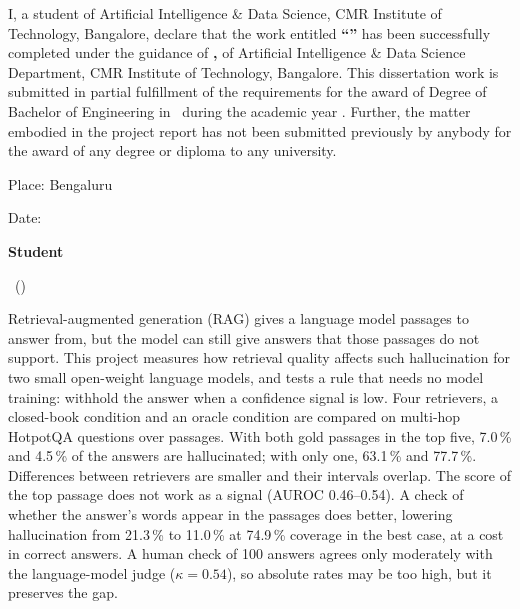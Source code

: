 {
I, a student of Artificial Intelligence \& Data Science, CMR Institute of Technology,
Bangalore, declare that the work entitled \textbf{``\ThesisTitle''} has been successfully
completed under the guidance of \textbf{\GuideName, \GuideTitle} of Artificial Intelligence
\& Data Science Department, CMR Institute of Technology, Bangalore. This dissertation work is
submitted in partial fulfillment of the requirements for the award of Degree of Bachelor of
Engineering in \DegreeName\ during the academic year \AcademicYear. Further, the matter
embodied in the project report has not been submitted previously by anybody for the award of
any degree or diploma to any university.\par}
\vspace{1.5cm}
Place: Bengaluru

Date:

\vspace{0.8em}
\textbf{Student}

\StudentName\ (\USN)

{
Retrieval-augmented generation (RAG) gives a language model passages to answer from, but the
model can still give answers that those passages do not support. This project measures how
retrieval quality affects such hallucination for two small open-weight language models, and
tests a rule that needs no model training: withhold the answer when a confidence signal is low.
Four retrievers, a closed-book condition and an oracle condition are compared on
 multi-hop HotpotQA questions over  passages. With
both gold passages in the top five, 7.0\,\% and 4.5\,\% of the answers are hallucinated; with only
one, 63.1\,\% and 77.7\,\%. Differences between retrievers are smaller and their intervals overlap.
The score of the top passage does not work as a signal (AUROC 0.46--0.54). A check of whether the
answer's words appear in the passages does better, lowering hallucination from 21.3\,\% to 11.0\,\%
at 74.9\,\% coverage in the best case, at a cost in correct answers. A human check of 100 answers
agrees only moderately with the language-model judge ($\kappa=0.54$), so absolute rates may be
too high, but it preserves the gap.\par}

